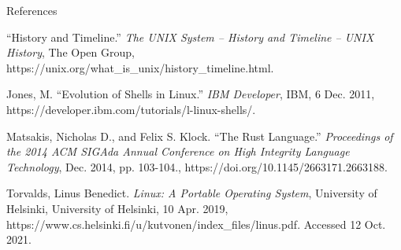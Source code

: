 \documentclass[12pt]{article}
\newcommand{\bibent}{\noindent \hangindent 40pt}
\newenvironment{workscited}{}{\newpage }
\begin{document}
\begin{flushleft}
			{\large References\par}
			\begin{workscited}
				
				\bibent
				“History and Timeline.” \textit{The UNIX System -- History and Timeline -- UNIX History}, The Open
				Group, https://unix.org/what\_is\_unix/history\_timeline.html.
				
				\bibent
				Jones, M. “Evolution of Shells in Linux.” \textit{IBM Developer}, IBM, 6 Dec. 2011,
				https://developer.ibm.com/tutorials/l-linux-shells/.
				
				\bibent
				Matsakis, Nicholas D., and Felix S. Klock. “The Rust Language.” \textit{Proceedings of the 2014 ACM
					SIGAda Annual Conference on High Integrity Language Technology}, Dec. 2014, pp. 
				103-104., https://doi.org/10.1145/2663171.2663188. 
				
				\bibent
				Torvalds, Linus Benedict. \textit{Linux: A Portable Operating System}, University of Helsinki,
				University of Helsinki, 10 Apr. 2019,
				https://www.cs.helsinki.fi/u/kutvonen/index\_files/linus.pdf.
				Accessed 12 Oct. 2021.
				
			\end{workscited}
			
		\end{flushleft}
	
\end{document}
